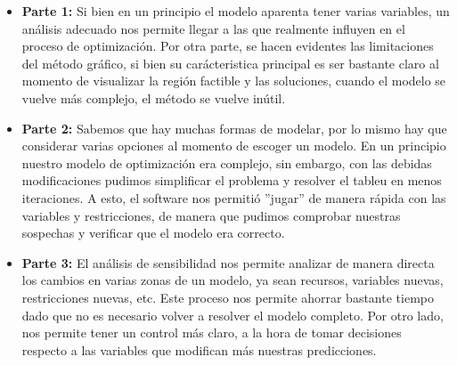 \begin{itemize}
	\item
		\textbf{Parte 1:} Si bien en un principio el modelo aparenta tener varias
		variables, un análisis adecuado nos permite llegar a las que realmente 
		influyen en el proceso de optimización. Por otra parte, se hacen
		evidentes las limitaciones del método gráfico, si bien su carácteristica
		principal es ser bastante claro al momento de visualizar la región
		factible y las soluciones, cuando el modelo se vuelve más complejo, el
		método se vuelve inútil.
	\item
		\textbf{Parte 2:} Sabemos que hay muchas formas de modelar, por lo mismo
		hay que considerar varias opciones al momento de escoger un modelo. En
		un principio nuestro modelo de optimización era complejo, sin embargo,
		con las debidas modificaciones pudimos simplificar el problema y
		resolver el tableu en menos iteraciones. A esto, el software nos 
		permitió ''jugar'' de manera rápida con las variables y restricciones,
		de manera que pudimos comprobar nuestras sospechas y verificar que el
		modelo era correcto.
	\item
		\textbf{Parte 3:} El análisis de sensibilidad nos permite analizar de
		manera directa los cambios en varias zonas de un modelo, ya sean
		recursos, variables nuevas, restricciones nuevas, etc. Este proceso nos
		permite ahorrar bastante tiempo dado que no es necesario volver a
		resolver el modelo completo. Por otro lado, nos permite tener un control
		más claro, a la hora de tomar decisiones respecto a las variables que
		modifican más nuestras predicciones.
\end{itemize}
